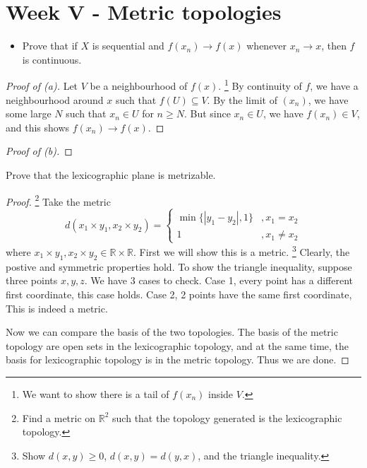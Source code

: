 \documentclass[../../main.tex]{subfiles}
\begin{document}
\section{Week V - Metric topologies}

\begin{problem}[4]
    \begin{itemize}
        \item[(b)] Prove that if $X$ is sequential and $f(x_n) \to f(x)$ whenever $x_n \to x$, then $f$ is continuous.
    \end{itemize}
\end{problem}

\begin{proof}[Proof of (a)]
    Let $V$ be a neighbourhood of $f(x)$.
    \footnote{We want to show there is a tail of $f(x_n)$ inside $V$.}
    By continuity of $f$, we have a neighbourhood around $x$ such that $f(U) \subseteq V$.
    By the limit of $(x_n)$, we have some large $N$ such that $x_n \in U$ for $n \ge N$.
    But since $x_n \in U$, we have $f(x_n) \in V$, and this shows $f(x_n) \to f(x)$.
\end{proof}

\begin{proof}[Proof of (b)]
\end{proof}

\begin{problem}[5]
    Prove that the lexicographic plane is metrizable.
\end{problem}
\begin{proof}
    \footnote{Find a metric on $\mathbb{R}^2$ such that the topology generated is the lexicographic topology.}
    Take the metric
    \[
        d(x_1 \times y_1, x_2 \times y_2) = \begin{cases}
            \min\{|y_1 - y_2|, 1\} &, x_1 = x_2 \\
            1 &, x_1 \ne x_2
        \end{cases}
    \]
    where $x_1 \times y_1, x_2 \times y_2 \in \mathbb{R} \times \mathbb{R}$.
    First we will show this is a metric.
    \footnote{Show $d(x, y) \ge 0$, $d(x, y) = d(y, x)$, and the triangle inequality.}
    Clearly, the postive and symmetric properties hold.
    To show the triangle inequality, suppose three points $x, y, z$.
    We have $3$ cases to check.
    Case 1, every point has a different first coordinate, this case holds.
    Case 2, 2 points have the same first coordinate, 
    This is indeed a metric.

    Now we can compare the basis of the two topologies.
    The basis of the metric topology are open sets in the lexicographic topology, and at the same time, the basis for lexicographic topology is in the metric topology.
    Thus we are done.
\end{proof}
\end{document}
